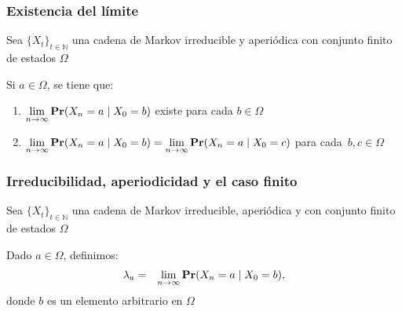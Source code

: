 \begin{frame}
\frametitle{Existencia del límite}

{\footnotesize

Sea $\{ X_t \}_{t \in \mathbb{N}}$ una cadena de Markov irreducible y aperiódica con conjunto finito de estados $\Omega$


\begin{teorema}
Si $a \in \Omega$, se tiene que:
\begin{enumerate}
\item ${\displaystyle \lim_{n \to \infty} {\rm {\bf Pr}}(X_n = a \mid X_0 = b)}$ existe para cada $b \in \Omega$


\item ${\displaystyle \lim_{n \to \infty} {\rm {\bf Pr}}(X_n = a \mid X_0 = b) =\lim_{n \to \infty} {\rm {\bf Pr}}(X_n = a \mid X_0 = c)}$ para cada~$b, c \in \Omega$
\end{enumerate}
\end{teorema}



}

\end{frame}



\begin{frame}
\frametitle{Irreducibilidad, aperiodicidad y el caso finito}

{\footnotesize

Sea $\{ X_t \}_{t \in \mathbb{N}}$ una cadena de Markov irreducible, aperiódica y con conjunto finito de estados $\Omega$


Dado $a \in \Omega$, definimos:
\alert{
\begin{eqnarray*}
\lambda_a & = & \lim_{n \to \infty} {\rm {\bf Pr}}(X_n = a \mid X_0 = b),
\end{eqnarray*}}
donde $b$ es un elemento arbitrario en $\Omega$



}

\end{frame}













